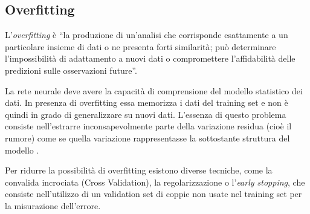 \subsection{Overfitting}
\label{subsec:overfitting}

L'\emph{overfitting} è ``la produzione di un'analisi che corrisponde esattamente a un particolare insieme di dati o ne presenta forti similarità; può determinare l'impossibilità di adattamento a nuovi dati o compromettere l'affidabilità delle predizioni sulle osservazioni future''.

La rete neurale deve avere la capacità di comprensione del modello statistico dei dati. In presenza di overfitting essa memorizza i dati del training set e non è quindi in grado di generalizzare su nuovi dati. L'essenza di questo problema consiste nell'estrarre inconsapevolmente parte della variazione residua (cioè il rumore) come se quella variazione rappresentasse la sottostante struttura del modello \cite{burnham2003model}.

Per ridurre la possibilità di overfitting esistono diverse tecniche, come la convalida incrociata (Cross Validation), la regolarizzazione o l'\emph{early stopping}, che consiste nell'utilizzo di un validation set di coppie non usate nel training set per la misurazione dell'errore.
